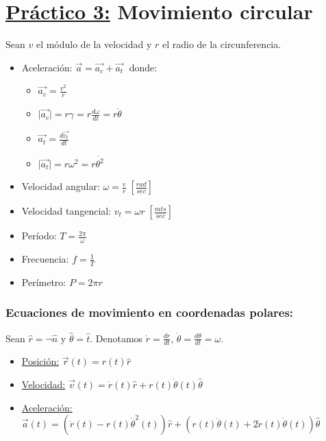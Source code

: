 \documentclass[12pt,a4paper]{article}
\providecommand{\abs}[1]{\lvert#1\rvert}
\newcommand{\PN}{\par\noindent}
\begin{document}
	\section*{\underline{Práctico 3:} Movimiento circular}
		\PN Sean $v$ el módulo de la velocidad y $r$ el radio de la circunferencia.
		\begin{multicols}{2}
			\begin{itemize}
				\item Aceleración: $\vec{a} = \vec{a_{c}} + \vec{a_{t}} \;$ donde:
					\begin{itemize}
						\item $\vec{a_{c}} = \frac{v^{2}}{r}$
						\item $\abs{\vec{a_{c}}} = r\gamma = r \frac{d\omega}{dt} = r \ddot{\theta}$
						\item $\vec{a_{t}} = \frac{d\vec{v_{t}}}{dt}$
						\item $\abs{\vec{a_{t}}} = r\omega^{2} = r \dot{\theta^{2}}$
					\end{itemize}
				\item Velocidad angular: $\omega = \frac{v}{r} \; [\frac{rad}{sec}]$
				\item Velocidad tangencial: $v_{t} = \omega r \; [\frac{mts}{sec}]$
				\item Período: $T = \frac{2\pi}{\omega}$
				\item Frecuencia: $f = \frac{1}{T}$
				\item Perímetro: $P = 2\pi r$
			\end{itemize}
		\end{multicols}

		\subsubsection*{Ecuaciones de movimiento en coordenadas polares:}
			\PN Sean $\hat{r} = \neg\hat{n}$ y $\hat{\theta} = \hat{t}$. Denotamos $\dot{r} = \frac{dr}{dt}$, $\dot{\theta} =
				\frac{d\theta}{dt} = \omega$.
			\begin{itemize}
				\item \underline{Posición:} $\vec{r}(t) = r(t) \hat{r}$
				\item \underline{Velocidad:} $\vec{v}(t) = \dot{r}(t) \hat{r} + r(t) \dot{\theta}(t) \hat{\theta}$
				\item \underline{Aceleración:} $\vec{a}(t) = (\ddot{r}(t) - r(t) \dot{\theta}^{2}(t)) \hat{r} + (r(t)
					\ddot{\theta}(t) + 2 \dot{r}(t) \dot{\theta}(t)) \hat{\theta}$
			\end{itemize}
\end{document}
